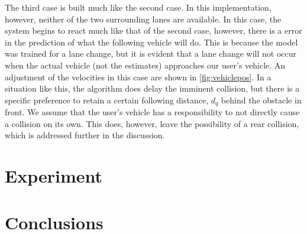 \documentclass[conference]{IEEEtran}
\begin{document}
The third case is built much like the second case. In this implementation, however, neither of the two surrounding lanes are available. In this case, the system begins to react much like that of the second case, however, there is a error in the prediction of what the following vehicle will do. This is because the model was trained for a lane change, but it is evident that a lane change will not occur when the actual vehicle (not the estimates) approaches our user's vehicle. An adjustment of the velocities in this case are shown in \ref{fig:vehiclepos}. In a situation like this, the algorithm does delay the imminent collision, but there is a specific preference to retain a certain following distance, $d_q$ behind the obstacle in front. We assume that the user's vehicle has a responsibility to not directly cause a collision on its own. This does, however, leave the possibility of a rear collision, which is addressed further in the discussion.


\section{Experiment}
\section{Conclusions}

\newpage

%
%
%


  
  





\end{document}
